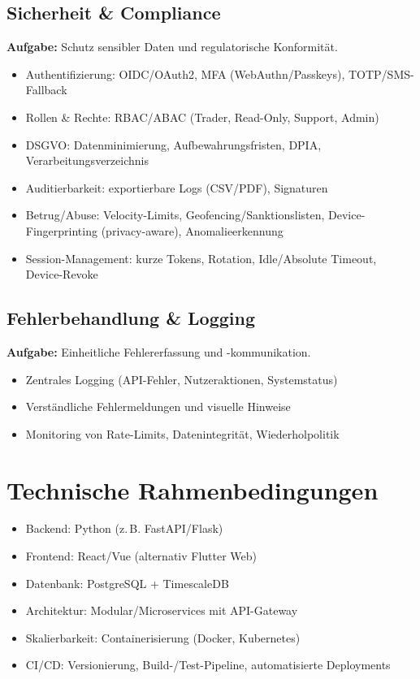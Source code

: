 \documentclass{article}
\begin{document}
\subsection{Sicherheit \& Compliance}
\textbf{Aufgabe:} Schutz sensibler Daten und regulatorische Konformität.
\begin{itemize}
  \item Authentifizierung: OIDC/OAuth2, MFA (WebAuthn/Passkeys), TOTP/SMS-Fallback
  \item Rollen \& Rechte: RBAC/ABAC (Trader, Read-Only, Support, Admin)
  \item DSGVO: Datenminimierung, Aufbewahrungsfristen, DPIA, Verarbeitungsverzeichnis
  \item Auditierbarkeit: exportierbare Logs (CSV/PDF), Signaturen
  \item Betrug/Abuse: Velocity-Limits, Geofencing/Sanktionslisten, Device-Fingerprinting (privacy-aware), Anomalieerkennung
  \item Session-Management: kurze Tokens, Rotation, Idle/Absolute Timeout, Device-Revoke
\end{itemize}

\subsection{Fehlerbehandlung \& Logging}
\textbf{Aufgabe:} Einheitliche Fehlererfassung und -kommunikation.
\begin{itemize}
  \item Zentrales Logging (API-Fehler, Nutzeraktionen, Systemstatus)
  \item Verständliche Fehlermeldungen und visuelle Hinweise
  \item Monitoring von Rate-Limits, Datenintegrität, Wiederholpolitik
\end{itemize}

\section{Technische Rahmenbedingungen}
\begin{itemize}
  \item Backend: Python (z.\,B. FastAPI/Flask)
  \item Frontend: React/Vue (alternativ Flutter Web)
  \item Datenbank: PostgreSQL + TimescaleDB
  \item Architektur: Modular/Microservices mit API-Gateway
  \item Skalierbarkeit: Containerisierung (Docker, Kubernetes)
  \item CI/CD: Versionierung, Build-/Test-Pipeline, automatisierte Deployments
\end{itemize}
\end{document}
